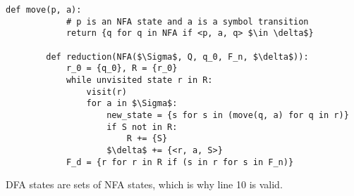 \documentclass[11pt]{article}
\begin{document}
	\begin{lstlisting}[autogobble=true,mathescape]
		def move(p, a):
			# p is an NFA state and a is a symbol transition
			return {q for q in NFA if <p, a, q> $\in \delta$}
			
		def reduction(NFA($\Sigma$, Q, q_0, F_n, $\delta$)):
			r_0 = {q_0}, R = {r_0}
			while unvisited state r in R:
				visit(r)
				for a in $\Sigma$:
					new_state = {s for s in (move(q, a) for q in r)}
					if S not in R:
						R += {S}
					$\delta$ += {<r, a, S>}
			F_d = {r for r in R if (s in r for s in F_n)}
	\end{lstlisting}
	DFA states are sets of NFA states, which is why line 10 is valid.

%		
%		


\end{document}
